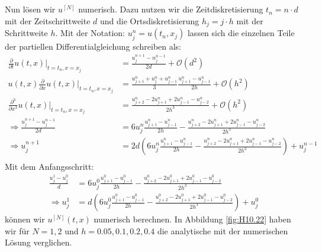 \documentclass[ngerman]{scrartcl}
\begin{document}
\subsection{}
Nun lösen wir $u^{[N]}$ numerisch.
Dazu nutzen wir die Zeitdiskretisierung $t_n = n \cdot d$ mit der Zeitschrittweite $d$
und die Ortsdiskretisierung $h_j = j \cdot h$ mit der Schrittweite $h$.
Mit der Notation: $u_j^n=u(t_n,x_j)$ lassen sich die einzelnen Teile der partiellen Differentialgleichung schreiben als:
\begin{align*}
	\frac{\partial}{\partial t}u(t,x) \bigg|_{t=t_n, x=x_j} &=\frac{u_j^{n+1}-n_j^{n-1}}{2d} + \mathcal O(d^2) \\
	u(t,x) \frac{\partial}{\partial x}u(t,x) \bigg|_{t=t_n, x=x_j} &=\frac{u_{j+1}^n + u_j^n + u_{j-1}^n}{3} \frac{u_{j+1}^n - u_{j-1}^n}{2h} + \mathcal O(h^2) \\
	\frac{\partial^3}{\partial x^3}u(t,x) \bigg|_{t=t_n, x=x_j} &=\frac{u_{j+2}^n - 2 u_{j+1}^n + 2 u_{j-1}^n - u_{j-2}^n}{2h^3} + \mathcal O(h^2) \\
	\Rightarrow\frac{u_j^{n+1} - u_j^{n-1}}{2d} &= 6u_j^n \frac{u_{j+1}^n - u_{j-1}^n}{2h} - \frac{u_{j+2}^n - 2u_{j+1}^n + 2u_{j-1}^n - u_{j-2}^n}{2h^3}\\
	\Rightarrow u_j^{n+1} &= 2d\left(6u_j^n \frac{u_{j+1}^n - u_{j-1}^n}{2h} - \frac{u_{j+2}^n - 2u_{j+1}^n + 2u_{j-1}^n - u_{j-2}^n}{2h^3}\right)+u_j^{n-1}\\
	\label{Formeln:Diskretisierung}
\end{align*}
Mit dem Anfangsschritt:
\begin{align*}
	\frac{u_j^1 - u_j^0}{d} &= 6u_j^0 \frac{u_{j+1}^0 - u_{j-1}^0}{2h} - \frac{u_{j+2}^0 - 2u_{j+1}^0 + 2u_{j-1}^0 - u_{j-2}^0}{2h^3}\\
	\Rightarrow u_j^1 &=d\left(6u_j^0 \frac{u_{j+1}^0 - u_{j-1}^0}{2h} - \frac{u_{j+2}^0 - 2u_{j+1}^0 + 2u_{j-1}^0 - u_{j-2}^0}{2h^3}\right)+u_j^0
\end{align*}
können wir $u^{[N]}(t,x)$ numerisch berechnen.
In Abbildung \ref{fig:H10.22} haben wir für $N=1,2$ und $h=0.05, 0.1, 0.2, 0.4$ die analytische mit der numerischen Lösung verglichen.
\end{document}
